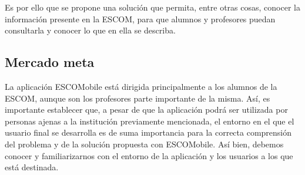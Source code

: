 \noindent 
\newline
Es por ello que se propone una solución que permita, entre otras cosas, conocer la información presente en la ESCOM, para que alumnos y profesores puedan consultarla y conocer lo que en ella se describa. 

\subsection{Mercado meta}

\noindent
La aplicación ESCOMobile está dirigida principalmente a los alumnos de la ESCOM, aunque son los profesores parte importante de la misma. Así, es importante establecer que, a pesar de que la aplicación podrá ser utilizada por personas ajenas a la institución previamente mencionada, el entorno en el que el usuario final se desarrolla es de suma importancia para la correcta comprensión del problema y de la solución propuesta con ESCOMobile. Así bien, debemos conocer y familiarizarnos con el entorno de la aplicación y los usuarios a los que está destinada. 
